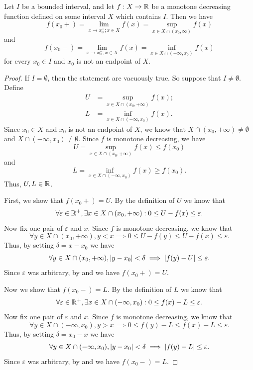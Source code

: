 \begin{ac}\label{i:ac:11.8.2}
  Let \(I\) be a bounded interval, and let \(f : X \to \mathbb{R}\) be a monotone decreasing function defined on some interval \(X\) which contains \(I\).
  Then we have
  \[
    f(x_0+) = \lim_{x \to x_0^+ ; x \in X} f(x) = \sup_{x \in X \cap (x_0, \infty)} f(x)
  \]
  and
  \[
    f(x_0-) = \lim_{x \to x_0^- ; x \in X} f(x) = \inf_{x \in X \cap (-\infty, x_0)} f(x)
  \]
  for every \(x_0 \in I\) and \(x_0\) is not an endpoint of \(X\).
\end{ac}

\begin{proof}
  If \(I = \emptyset\), then the statement are vacuously true.
  So suppose that \(I \neq \emptyset\).
  Define
  \begin{align*}
    U & = \sup_{x \in X \cap (x_0, +\infty)} f(x); \\
    L & = \inf_{x \in X \cap (-\infty, x_0)} f(x).
  \end{align*}
  Since \(x_0 \in X\) and \(x_0\) is not an endpoint of \(X\), we know that \(X \cap (x_0, +\infty) \neq \emptyset\) and \(X \cap (-\infty, x_0) \neq \emptyset\).
  Since \(f\) is monotone decreasing, we have
  \[
    U = \sup_{x \in X \cap (x_0, +\infty)} f(x) \leq f(x_0)
  \]
  and
  \[
    L = \inf_{x \in X \cap (-\infty, x_0)} f(x) \geq f(x_0).
  \]
  Thus, \(U, L \in \mathbb{R}\).

  First, we show that \(f(x_0+) = U\).
  By the definition of \(U\) we know that
  \[
    \forall \varepsilon \in \mathbb{R}^+, \exists x \in X \cap (x_0, +\infty) : 0 \leq U - f(x) \leq \varepsilon.
  \]
  Now fix one pair of \(\varepsilon\) and \(x\).
  Since \(f\) is monotone decreasing, we know that
  \[
    \forall y \in X \cap (x_0, +\infty), y < x \implies 0 \leq U - f(y) \leq U - f(x) \leq \varepsilon.
  \]
  Thus, by setting \(\delta = x - x_0\) we have
  \[
    \forall y \in X \cap (x_0, +\infty), \left\lvert y - x_0\right\rvert < \delta \implies \left\lvert f(y) - U\right\rvert \leq \varepsilon.
  \]
  Since \(\varepsilon\) was arbitrary, by  and  we have \(f(x_0+) = U\).

  Now we show that \(f(x_0-) = L\).
  By the definition of \(L\) we know that
  \[
    \forall \varepsilon \in \mathbb{R}^+, \exists x \in X \cap (-\infty, x_0) : 0 \leq f(x) - L \leq \varepsilon.
  \]
  Now fix one pair of \(\varepsilon\) and \(x\).
  Since \(f\) is monotone decreasing, we know that
  \[
    \forall y \in X \cap (-\infty, x_0), y > x \implies 0 \leq f(y) - L \leq f(x) - L \leq \varepsilon.
  \]
  Thus, by setting \(\delta = x_0 - x\) we have
  \[
    \forall y \in X \cap (-\infty, x_0), \left\lvert y - x_0\right\rvert < \delta \implies \left\lvert f(y) - L\right\rvert \leq \varepsilon.
  \]
  Since \(\varepsilon\) was arbitrary, by  and  we have \(f(x_0-) = L\).
\end{proof}

